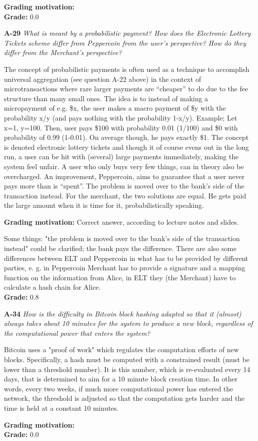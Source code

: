 \documentclass[a4paper]{article}
\newcommand{\Q}[2]{
  \vspace{10pt} \textbf{#1} \textit{#2}
 }
\newcommand{\A}[1]{ #1 }
\newcommand{\Grade}[2]{ 
  \textbf{Grading motivation:} #2 \\ 
  \hspace*{\fill} \textbf{Grade:} #1 
}
\begin{document}
\Grade{0.0}{}

\Q{A-29} {What  is  meant  by  a  probabilistic  payment?   How  does  the  
Electronic  Lottery  Tickets  scheme  differ from Peppercoin from the user's perspective?
How do they differ from the Merchant's perspective?}

\A{
  The concept of probabilistic payments is often used as a technique to accomplish
  universal aggregation (see question A-22 above) in the context of microtransactions where rare
  larger payments are “cheaper” to do due to the fee structure than many small ones. The idea is
  to instead of making a micropayment of e.g. \$x, the user makes a macro payment of \$y with the
  probability x/y (and pays nothing with the probability 1-x/y). Example; Let x=1, y=100. Then,
  user pays \$100 with probability 0.01 (1/100) and \$0 with probability of 0.99 (1-0.01). On average
  though, he pays exactly \$1.
  The concept is denoted electronic lottery tickets and though it of course evens out in the long
  run, a user can be hit with (several) large payments immediately, making the system feel unfair.
  A user who only buys very few things, can in theory also be overcharged. An improvement,
  Peppercoin, aims to guarantee that a user never pays more than is “spent”. The problem is
  moved over to the bank’s side of the transaction instead. For the merchant, the two solutions
  are equal. He gets paid the large amount when it is time for it, probabilistically speaking.
}

\Grade{0.8}{
  Correct answer, according to lecture notes and slides.

  Some things: "the problem is moved over to the bank's side
  of the transaction instead" could be clarified; the bank pays the 
  difference. There are also some differences between ELT and Peppercoin in 
  what has to be provided by different parties, e. g. in Peppercoin
  Merchant has to provide a signature and a mapping function on the information
  from Alice, in ELT they (the Merchant) have to calculate a hash chain for 
  Alice.
}

\Q{A-34} {How  is  the  difficulty  in  Bitcoin  block  hashing  adapted  so  that  it  
(almost)  always  takes  about  10 minutes for the system to produce a new block, 
regardless of the computational power that enters the system?}

\A{
  Bitcoin uses a "proof of work" which regulates the computation efforts of new blocks.
  Specifically, a hash must be computed with a constrained result (must be lower than a threshold
  number). It is this number, which is re-evaluated every 14 days, that is determined to aim for a
  10 minute block creation time. In other words, every two weeks, if much more computational
  power has entered the network, the threshold is adjusted so that the computation gets harder
  and the time is held at a constant 10 minutes.
}

\Grade{0.0}{}
\end{document}
